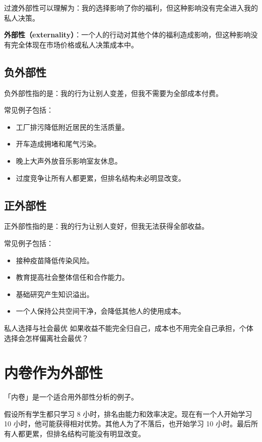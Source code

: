 \documentclass[10pt,a4paper]{ctexart}
\newcommand{\transitionnote}[1]{\begin{conceptbox}{过渡}#1\end{conceptbox}}
\begin{document}
\transitionnote{外部性可以理解为：我的选择影响了你的福利，但这种影响没有完全进入我的私人决策。}

\textbf{外部性（externality）}：一个人的行动对其他个体的福利造成影响，但这种影响没有完全体现在市场价格或私人决策成本中。

\subsection{负外部性}

负外部性指的是：我的行为让别人变差，但我不需要为全部成本付费。

常见例子包括：
\begin{itemize}
  \item 工厂排污降低附近居民的生活质量。
  \item 开车造成拥堵和尾气污染。
  \item 晚上大声外放音乐影响室友休息。
  \item 过度竞争让所有人都更累，但排名结构未必明显改变。
\end{itemize}

\subsection{正外部性}

正外部性指的是：我的行为让别人变好，但我无法获得全部收益。

常见例子包括：
\begin{itemize}
  \item 接种疫苗降低传染风险。
  \item 教育提高社会整体信任和合作能力。
  \item 基础研究产生知识溢出。
  \item 一个人保持公共空间干净，会降低其他人的使用成本。
\end{itemize}

\begin{discussionbox}{私人选择与社会最优}
如果收益不能完全归自己，成本也不用完全自己承担，个体选择会怎样偏离社会最优？
\end{discussionbox}

\section{内卷作为外部性}

「内卷」是一个适合用外部性分析的例子。

假设所有学生都只学习 8 小时，排名由能力和效率决定。现在有一个人开始学习 10 小时，他可能获得相对优势。其他人为了不落后，也开始学习 10 小时。最后所有人都更累，但排名结构可能没有明显改变。
\end{document}

